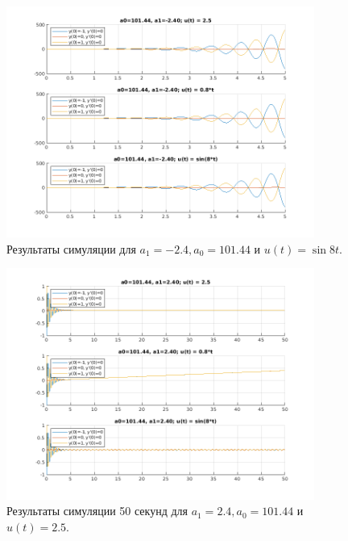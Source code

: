 \begin{figure}
    \centering
    \includegraphics[width=0.9\textwidth]{figs/task_1_out_3.png}
    \caption{Результаты симуляции для $a_1 = -2.4, a_0 = 101.44$ и $u(t) = \sin 8t$.}
    \label{fig:task_1_out_3}
\end{figure}

\begin{figure}
    \centering
    \includegraphics[width=0.9\textwidth]{figs/task_1_out_11.png}
    \caption{Результаты симуляции 50 секунд для $a_1 = 2.4, a_0 = 101.44$ и $u(t) = 2.5$.}
    \label{fig:task_1_out_11}
\end{figure}

